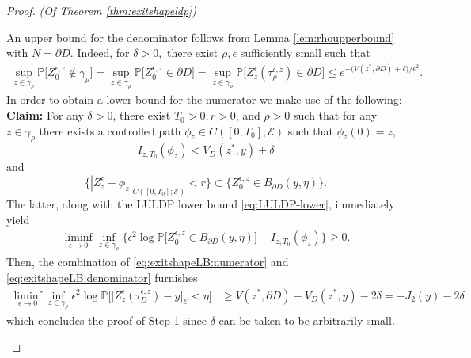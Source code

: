 \documentclass[10pt, reqno]{amsart}
\newcommand{\pr}{\mathbb{P}}
\newcommand{\e}{\mathcal{E}}
\theoremstyle{definition}
\numberwithin{lem}{section}
\numberwithin{cor}{section}
\numberwithin{prop}{section}
\numberwithin{thm}{section}
\numberwithin{dfn}{section}
\begin{document}
\begin{proof}{\textit{(Of Theorem \ref{thm:exitshapeldp})}}
\begin{enumerate}
An upper bound for the denominator follows from Lemma \ref{lem:rhoupperbound} with $N=\partial D.$ Indeed, for $\delta>0,$ there exist $\rho, \epsilon$ sufficiently small such that  
\begin{equation}\label{eq:exitshapeLB:denominator}
    \begin{aligned}
       \sup_{z\in\gamma_\rho}\pr\bigg[ Z^{\epsilon, z}_{0}\notin \gamma_\rho \bigg]=\sup_{z\in\gamma_\rho}\pr\bigg[ Z^{\epsilon, z}_{0}\in\partial D \bigg]=\sup_{z\in\gamma_\rho}\pr\bigg[ Z^{\epsilon}_z(\tau^{\epsilon, z}_\rho)\in\partial D \bigg]\leq e^{ -\big(V(z^*, \partial D)+\delta\big)/\epsilon^2}.
    \end{aligned}
\end{equation}
\noindent In order to obtain a lower bound for the numerator we make use of the following:\\
\noindent \textbf{Claim:} For any $\delta>0$, there exist $T_0>0, r>0$, and $\rho>0$ such that for any $ z \in \gamma_\rho$ there exists a controlled path $\phi_z \in C([0,T_0];\e)$ such that  $\phi_z(0)=z$, %
$$I_{z,T_0}(\phi_z)<V_D(z^*, y)+\delta$$  and $$\big\{|Z^{\epsilon}_z-\phi_z|_{C([0,T_0];\e)}<r\big\}\subset \big\{Z^{\epsilon, z}_{0}\in B_{\partial D}(y, \eta)   \big\}.  $$
\noindent The latter, along with the LULDP lower bound \eqref{eq:LULDP-lower}, immediately yield
\begin{equation}\label{eq:exitshapeLB:numerator}
    \begin{aligned}
        \liminf_{\epsilon\to 0}\inf_{z\in\gamma_\rho}\bigg\{\epsilon^2\log\pr\bigg[Z^{\epsilon, z}_{0}\in B_{\partial D}(y, \eta)  \bigg]+I_{z,T_0}(\phi_z)\bigg\} \geq 0.
    \end{aligned}
\end{equation}
Then, the combination of \eqref{eq:exitshapeLB:numerator} and \eqref{eq:exitshapeLB:denominator} furnishes
\begin{equation*}
    \begin{aligned}       \liminf_{\epsilon\to 0}\inf_{z\in\gamma_\rho}\epsilon^2\log \pr\bigg[\big|Z^\epsilon_z(\tau^{\epsilon, z}_{D})-y\big|_{\e}<\eta\bigg]&\geq V(z^*, \partial D)-  V_D(z^*, y)   -    2\delta=-J_2(y)-2\delta
\end{aligned}
\end{equation*}
which concludes the proof of Step 1 since $\delta$ can be taken to be arbitrarily small.

 
 

\end{enumerate}
\end{proof}
\end{document}

